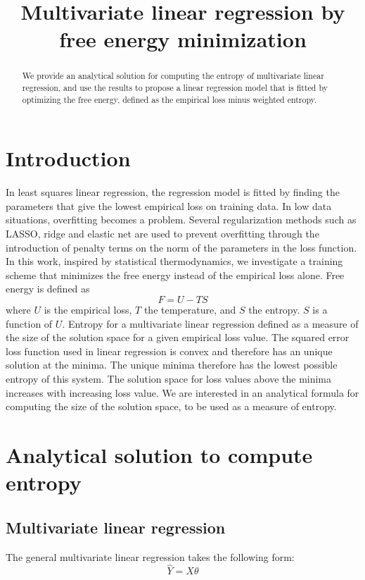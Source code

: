 \documentclass{article}
\title{Multivariate linear regression by free energy minimization}
\begin{document}
\maketitle

\begin{abstract}
We provide an analytical solution for computing the entropy of multivariate linear regression, and use the results to propose a linear regression model that is fitted by optimizing the free energy, defined as the empirical loss minus weighted entropy.  
\end{abstract}

\section{Introduction}

In least squares linear regression, the regression model is fitted by finding the parameters that give the lowest empirical loss on training data. In low data situations, overfitting becomes a problem. Several regularization methods such as LASSO, ridge and elastic net are used to prevent overfitting through the introduction of penalty terms on the norm of the parameters in the loss function. In this work, inspired by statistical thermodynamics, we investigate a training scheme that minimizes the free energy instead of the empirical loss alone. Free energy is defined as 
\[
F = U - TS
\]
where $U$ is the empirical loss, $T$ the temperature, and $S$ the entropy. $S$ is a function of $U$. Entropy for a multivariate linear regression defined as a measure of the size of the solution space for a given empirical loss value.
The squared error loss function used in linear regression is convex and therefore has an unique solution at the minima. The unique minima therefore has the lowest possible entropy of this system. The solution space for loss values above the minima increases with increasing loss value. We are interested in an analytical formula for computing the size of the solution space, to be used as a measure of entropy.

\section{Analytical solution to compute entropy}
\subsection{Multivariate linear regression}
The general multivariate linear regression takes the following form:
\[
\hat{Y} = X\theta
\]
\end{document}
